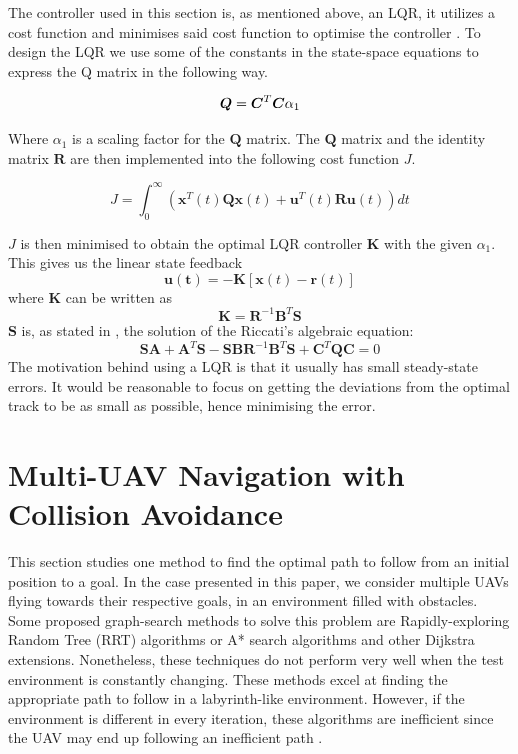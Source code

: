 \documentclass[journal]{IEEEtran}
\begin{document}
	The controller used in this section is, as mentioned above, an LQR, it utilizes a cost function and minimises said cost function to optimise the controller \cite{bokLQ}. To design the LQR we use some of the constants in the state-space equations to express the Q matrix in the following way.
	
	\begin{equation}
	\bm{Q}=\bm{C^}{T}\bm{C}\alpha_{1}
	\end{equation}
	
	Where $\alpha_{1}$ is a scaling factor for the $\bm{Q}$ matrix.
	The $\bm{Q}$ matrix and the identity matrix $\bm{R}$ are then implemented into the following cost function $J$.
	
	\begin{equation}\label{eq:costfunctionJ}
	J = \int_{0}^{\infty} (\bm{x}^{T}(t)\bm{Q}\bm{x}(t)+\bm{u}^{T}(t)\bm{R}\bm{u}(t)) dt
	\end{equation}
	
	$J$ is then minimised to obtain the optimal LQR controller $\bm{K}$ with the given $\alpha_{1}$. This gives us the	linear state  feedback
	\begin{equation}\label{eq:linearstatefeedback}
	\bm{u(t)} = -\bm{K}[\bm{x}(t)-\bm{r}(t)]
\end{equation}
	where $\bm{K}$ can be written as		
	\begin{equation}\label{eq:linearstatefeedback2}
		\bm{K} = \bm{R}^{-1}\bm{B}^T\bm{S}
	\end{equation}
		$\bm{S}$ is, as stated in \cite{mod_control_bresciani}, the solution of the Riccati's algebraic equation: 
	\begin{equation}\label{eq:linearstatefeedback3}
		\bm{S}\bm{A} + \bm{A}^T\bm{S} - \bm{S}\bm{B}\bm{R}^{-1}\bm{B}^T\bm{S} + \bm{C}^T\bm{Q}\bm{C} = 0
	\end{equation}	
	 The motivation behind using a LQR is that it usually has small steady-state errors\cite{lqr_error}. It would be reasonable to focus on getting the deviations from the optimal track to be as small as possible, hence minimising the error.   
	
		
	\section{Multi-UAV Navigation with Collision Avoidance}\label{navigation}
		This section studies one method to find the optimal path to follow from an initial position to a goal. In the case presented in this paper, we consider multiple UAVs flying towards their respective goals, in an environment filled with obstacles. Some proposed graph-search methods to solve this problem are Rapidly-exploring Random Tree (RRT) algorithms or A* search algorithms and other Dijkstra extensions.	Nonetheless, these techniques do not perform very well when the test environment is constantly changing. These methods excel at finding the appropriate path to follow in a labyrinth-like environment. However, if the environment is different in every iteration, these algorithms are inefficient since the UAV may end up following an inefficient path \cite{lavalle_rrt, lavalle_astar}.\\
		
\end{document}
